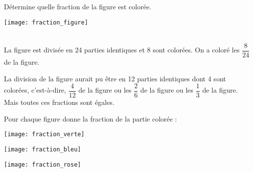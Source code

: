 \begin{methode*1}

\begin{exemple*1}
\begin{minipage}[c]{0.4\linewidth}
Détermine quelle fraction de la figure est colorée.
 \end{minipage} \hfill%
 \begin{minipage}[c]{0.4\linewidth}
\texttt{[image: fraction\_figure]}
 \end{minipage} \\[1em]
La figure est divisée en 24 parties identiques et 8 sont colorées. On a coloré les $\dfrac{8}{24}$ de la figure.
 \end{exemple*1}
 
\begin{remarque}
La division de la figure aurait pu être en 12 parties identiques dont 4 sont colorées, c'est-à-dire, $\dfrac{4}{12}$ de la figure ou les $\dfrac{2}{6}$ de la figure ou les $\dfrac{1}{3}$ de la figure. Mais toutes ces fractions sont égales.
 \end{remarque}

  \exercice
Pour chaque figure donne la fraction de la partie colorée :
\begin{colenumerate}{3}
 \item 
 
 \texttt{[image: fraction\_verte]}
 \item 
 
 \texttt{[image: fraction\_bleu]}
 \item 
 
 \texttt{[image: fraction\_rose]}
 \end{colenumerate}  

 \end{methode*1}


